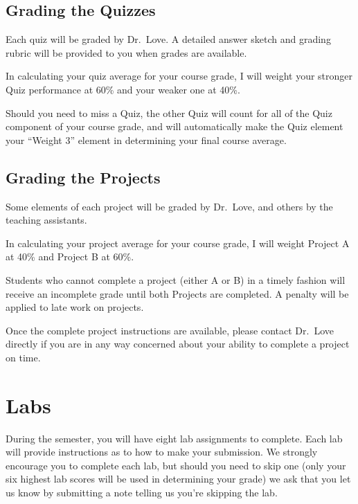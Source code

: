 \documentclass[
]{book}
\begin{document}
\hypertarget{grading-the-quizzes}{%
\section{Grading the Quizzes}\label{grading-the-quizzes}}

Each quiz will be graded by Dr.~Love. A detailed answer sketch and grading rubric will be provided to you when grades are available.

In calculating your quiz average for your course grade, I will weight your stronger Quiz performance at 60\% and your weaker one at 40\%.

Should you need to miss a Quiz, the other Quiz will count for all of the Quiz component of your course grade, and will automatically make the Quiz element your ``Weight 3'' element in determining your final course average.

\hypertarget{grading-the-projects}{%
\section{Grading the Projects}\label{grading-the-projects}}

Some elements of each project will be graded by Dr.~Love, and others by the teaching assistants.

In calculating your project average for your course grade, I will weight Project A at 40\% and Project B at 60\%.

Students who cannot complete a project (either A or B) in a timely fashion will receive an incomplete grade until both Projects are completed. A penalty will be applied to late work on projects.

Once the complete project instructions are available, please contact Dr.~Love directly if you are in any way concerned about your ability to complete a project on time.

\hypertarget{labs}{%
\chapter{Labs}\label{labs}}

During the semester, you will have eight lab assignments to complete. Each lab will provide instructions as to how to make your submission. We strongly encourage you to complete each lab, but should you need to skip one (only your six highest lab scores will be used in determining your grade) we ask that you let us know by submitting a note telling us you're skipping the lab.
\end{document}
